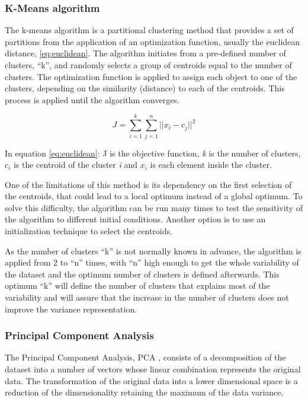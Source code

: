 \subsubsection{K-Means algorithm}

The k-means algorithm is a partitional clustering method that provides a set of partitions from the application of an optimization function, usually the euclidean distance, \ref{eq:euclidean}. The algorithm initiates from a pre-defined number of clusters, ``k'', and randomly selects a group of centroids equal to the number of clusters. The optimization function is applied to assign each object to one of the clusters, depending on the similarity (distance) to each of the centroids. This process is applied until the algorithm converges.

\begin{equation}\label{eq:euclidean}
    J =\sum_{i=1}^{k}\sum_{j=1}^{n}{||x_i-c_j||}^2
\end{equation}

In equation \ref{eq:euclidean}: J is the objective function, \textit{k} is the number of clusters, $c_{i}$ is the centroid of the cluster \textit{i} and $x_{i}$ is each element inside the cluster.

One of the limitations of this method is its dependency on the first selection of the centroids, that could lead to a local optimum instead of a global optimum. To solve this difficulty, the algorithm can be run many times to test the sensitivity of the algorithm to different initial conditions. Another option is to use an initialization technique to select the centroids.

As the number of clusters ``k'' is not normally known in advance, the algorithm is applied from 2 to ``n'' times, with ``n'' high enough to get the whole variability of the dataset and the optimum number of clusters is defined afterwards. This optimum ``k'' will define the number of clusters that explains most of the variability and will assure that the increase in the number of clusters does not improve the variance representation.

\subsubsection{Principal Component Analysis}

The Principal Component Analysis, PCA \cite*{jolliffe2011}, consists of a decomposition of the dataset into a number of vectors whose linear combination represents the original data. The transformation of the original data into a lower dimensional space is a reduction of the dimensionality retaining the maximum of the data variance.

